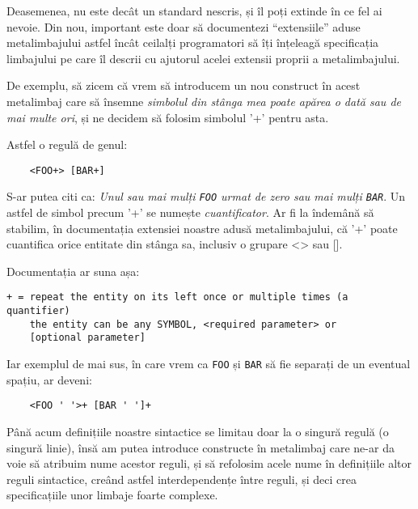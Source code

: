 Deasemenea, nu este decât un standard nescris, și îl poți
extinde în ce fel ai nevoie. Din nou, important este doar
să documentezi ``extensiile'' aduse metalimbajului astfel
încât ceilalți programatori să îți înțeleagă specificația
limbajului pe care îl descrii cu ajutorul acelei
extensii proprii a metalimbajului.

De exemplu, să zicem că vrem să introducem un nou
construct în acest metalimbaj care să însemne \textit{simbolul
din stânga mea poate apărea o dată sau de mai multe ori}, și
ne decidem să folosim simbolul '+' pentru asta.

Astfel o regulă de genul:
\begin{verbatim}
	<FOO+> [BAR+]
\end{verbatim}
S-ar putea citi ca: \textit{Unul sau mai mulți \texttt{FOO} urmat de zero sau mai
mulți \texttt{BAR}}. Un astfel de simbol precum '+' se numește \textsl{cuantificator}.
Ar fi la îndemână să stabilim, în documentația extensiei noastre adusă metalimbajului,
că '+' poate cuantifica orice entitate din stânga sa, inclusiv o grupare <> sau [].

Documentația ar suna așa:
\begin{verbatim}
+ = repeat the entity on its left once or multiple times (a quantifier)
    the entity can be any SYMBOL, <required parameter> or
	[optional parameter]
\end{verbatim}
Iar exemplul de mai sus, în care vrem ca \texttt{FOO} și \texttt{BAR}
să fie separați de un eventual spațiu, ar deveni:
\begin{verbatim}
	<FOO ' '>+ [BAR ' ']+
\end{verbatim}

Până acum definițiile noastre sintactice se limitau doar la
o singură regulă (o singură linie), însă am putea introduce
constructe în metalimbaj care ne-ar da voie să atribuim nume
acestor reguli, și să refolosim acele nume în definițiile altor
reguli sintactice, creând astfel interdependențe între reguli,
și deci crea specificațiile unor limbaje foarte complexe.


